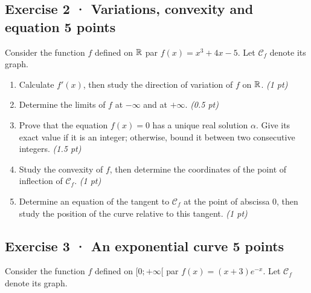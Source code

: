 \subsection*{Exercise 2 · Variations, convexity and equation \hfill 5 points}Consider the function $f$ defined on $\mathbb R$ par $f(x)=x^3+4x-5$. Let $\mathcal C_f$ denote its graph.

\begin{enumerate}

\item Calculate $f'(x)$, then study the direction of variation of $f$ on $\mathbb R$. \hfill\textit{(1 pt)}

\item Determine the limits of $f$ at $-\infty$ and at $+\infty$. \hfill\textit{(0.5 pt)}

\item Prove that the equation $f(x)=0$ has a unique real solution $\alpha$. Give its exact value if it is an integer; otherwise, bound it between two consecutive integers. \hfill\textit{(1.5 pt)}

\item Study the convexity of $f$, then determine the coordinates of the point of inflection of $\mathcal C_f$. \hfill\textit{(1 pt)}

\item Determine an equation of the tangent to $\mathcal C_f$ at the point of abscissa $0$, then study the position of the curve relative to this tangent. \hfill\textit{(1 pt)}

\end{enumerate}

\clearpage{}\par

\subsection*{Exercise 3 · An exponential curve \hfill 5 points}Consider the function $f$ defined on $[0;+\infty[$ par $f(x)=(x+3)e^{-x}$. Let $\mathcal C_f$ denote its graph.


